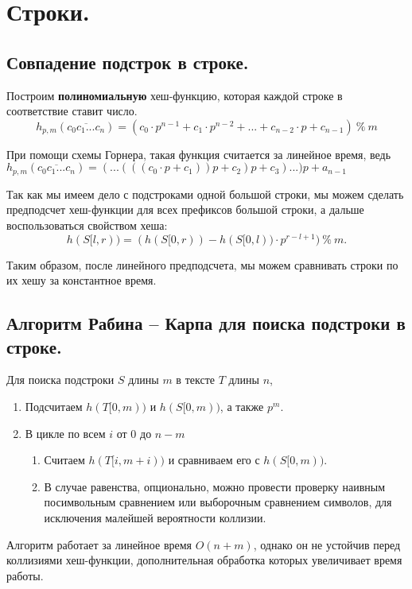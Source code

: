 \section{Строки.}%


\subsection{Совпадение подстрок в строке.}%

Построим \textbf{полиномиальную} хеш-функцию, которая каждой строке в соответствие ставит число.
\[h_{p, m}(\overline{c_{0}c_{1}...c_{n}}) = (c_0 \cdot p^{n - 1} + c_1 \cdot p^{n-2} + ... + c_{n - 2} \cdot p + c_{n - 1}) \ \% \ m\]

При помощи схемы Горнера, такая функция считается за линейное время, ведь $h_{p, m}(\overline{c_{0}c_{1}...c_{n}}) = (...(((c_0 \cdot p + c_1))p + c_2)p + c_3)...)p + a_{n-1}$

Так как мы имеем дело с подстроками одной большой строки, мы можем сделать предподсчет хеш-функции для всех префиксов большой строки, а дальше воспользоваться свойством хеша:
\[
	h(S[l, r)) = (h(S[0, r)) - h(S[0, l)) \cdot p^{r - l + 1}) \ \% \ m
.\] 

Таким образом, после линейного предподсчета, мы можем сравнивать строки по их хешу за константное время.


\subsection{Алгоритм Рабина -- Карпа для поиска подстроки в строке.}%

Для поиска подстроки $S$ длины $m$ в тексте $T$ длины $n$, 
\begin{enumerate}
	\item Подсчитаем $h(T[0, m))$ и $h(S[0, m))$, а также $p^m$.
	\item В цикле по всем $i$ от  $0$ до $n - m$
		\begin{enumerate}
			\item Считаем $h(T[i, m + i))$ и сравниваем его с $h(S[0, m))$. 
			\item В случае равенства, опционально, можно провести проверку наивным посимвольным сравнением или выборочным сравнением символов, для исключения малейшей вероятности коллизии.
		\end{enumerate}
\end{enumerate}

Алгоритм работает за линейное время $O(n + m)$, однако он не устойчив перед коллизиями хеш-функции, дополнительная обработка которых увеличивает время работы.


